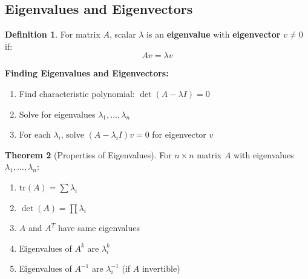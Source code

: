 \documentclass[12pt,a4paper]{article}
\theoremstyle{definition}
\newtheorem{theorem}{Theorem}[section]
\newtheorem{definition}[theorem]{Definition}
\begin{document}
\subsection{Eigenvalues and Eigenvectors}

\begin{definition}
For matrix $A$, scalar $\lambda$ is an \textbf{eigenvalue} with \textbf{eigenvector} $v \neq 0$ if:
\[
Av = \lambda v
\]
\end{definition}

\begin{importantbox}
\textbf{Finding Eigenvalues and Eigenvectors:}
\begin{enumerate}
    \item Find characteristic polynomial: $\det(A - \lambda I) = 0$
    \item Solve for eigenvalues $\lambda_1, \ldots, \lambda_n$
    \item For each $\lambda_i$, solve $(A - \lambda_i I)v = 0$ for eigenvector $v$
\end{enumerate}
\end{importantbox}

\begin{theorem}[Properties of Eigenvalues]
For $n \times n$ matrix $A$ with eigenvalues $\lambda_1, \ldots, \lambda_n$:
\begin{enumerate}
    \item $\text{tr}(A) = \sum \lambda_i$
    \item $\det(A) = \prod \lambda_i$
    \item $A$ and $A^T$ have same eigenvalues
    \item Eigenvalues of $A^k$ are $\lambda_i^k$
    \item Eigenvalues of $A^{-1}$ are $\lambda_i^{-1}$ (if $A$ invertible)
\end{enumerate}
\end{theorem}
\end{document}
